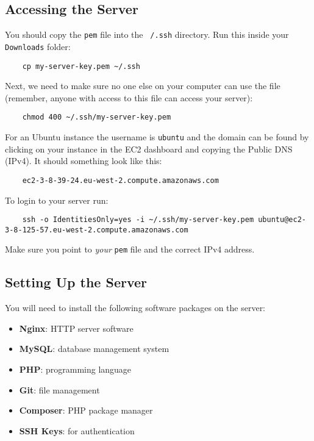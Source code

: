 


\subsection{Accessing the Server}

You should copy the \texttt{pem} file into the \texttt{~/.ssh} directory. Run this inside your \texttt{Downloads} folder:

\begin{verbatim}
    cp my-server-key.pem ~/.ssh
\end{verbatim}

Next, we need to make sure no one else on your computer can use the file (remember, anyone with access to this file can access your server):

\begin{verbatim}
    chmod 400 ~/.ssh/my-server-key.pem
\end{verbatim}

For an Ubuntu instance the username is \texttt{ubuntu} and the domain can be found by clicking on your instance in the EC2 dashboard and copying the Public DNS (IPv4). It should something look like this:

\begin{verbatim}
    ec2-3-8-39-24.eu-west-2.compute.amazonaws.com
\end{verbatim}

To login to your server run:

\begin{verbatim}
    ssh -o IdentitiesOnly=yes -i ~/.ssh/my-server-key.pem ubuntu@ec2-3-8-125-57.eu-west-2.compute.amazonaws.com
\end{verbatim}

Make sure you point to \textit{your} \texttt{pem} file and the correct IPv4 address.


\subsection{Setting Up the Server}

You will need to install the following software packages on the server:

\begin{itemize}
    \item \textbf{Nginx}: HTTP server software
    \item \textbf{MySQL}: database management system
    \item \textbf{PHP}: programming language
    \item \textbf{Git}: file management
    \item \textbf{Composer}: PHP package manager
    \item \textbf{SSH Keys}: for authentication
\end{itemize}

